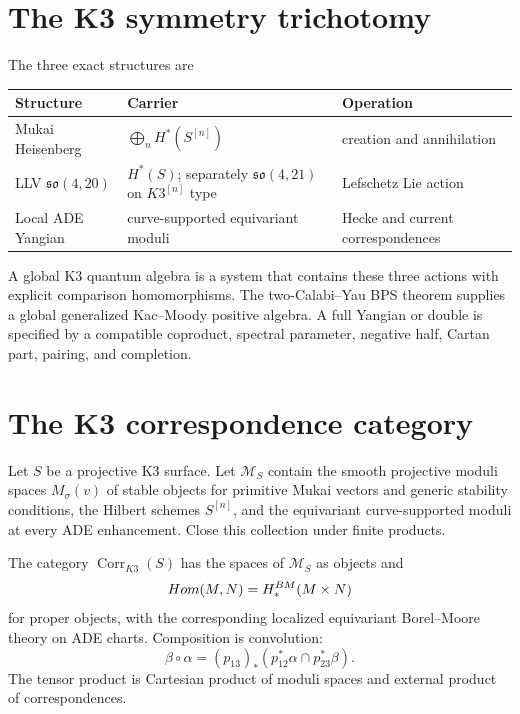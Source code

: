 \chapter{The K3 symmetry trichotomy}
The three exact structures are
\begin{center}
\small
\begin{tabularx}{0.96\textwidth}{@{}>{\raggedright\arraybackslash}p{}>{\raggedright\arraybackslash}X>{\raggedright\arraybackslash}p{}@{}}
\toprule
\textbf{Structure}&\textbf{Carrier}&\textbf{Operation}\\
\midrule
Mukai Heisenberg&$\bigoplus_nH^*(S^{[n]})$&creation and annihilation\\
LLV $\mathfrak{so}(4,20)$&$H^*(S)$; separately $\mathfrak{so}(4,21)$ on $K3^{[n]}$ type&Lefschetz Lie action\\
Local ADE Yangian&curve-supported equivariant moduli&Hecke and current correspondences\\
\bottomrule
\end{tabularx}
\end{center}
A global K3 quantum algebra is a system that contains these three actions with explicit comparison homomorphisms. The two-Calabi--Yau BPS theorem supplies a global generalized Kac--Moody positive algebra. A full Yangian or double is specified by a compatible coproduct, spectral parameter, negative half, Cartan part, pairing, and completion.

\chapter{The K3 correspondence category}
Let $S$ be a projective K3 surface.  Let $\mathscr M_S$ contain the smooth projective moduli spaces $M_\sigma(v)$ of stable objects for primitive Mukai vectors and generic stability conditions, the Hilbert schemes $S^{[n]}$, and the equivariant curve-supported moduli at every ADE enhancement.  Close this collection under finite products.

\begin{definition}
The category $\operatorname{Corr}_{K3}(S)$ has the spaces of $\mathscr M_S$ as objects and
\[
 Hom(M,N)=H^{BM}_*(M\times N)
\]
for proper objects, with the corresponding localized equivariant Borel--Moore theory on ADE charts.  Composition is convolution:
\[
 \beta\circ\alpha
 =(p_{13})_*
 \left(p_{12}^*\alpha\cap p_{23}^*\beta\right).
\]
The tensor product is Cartesian product of moduli spaces and external product of correspondences.
\end{definition}


